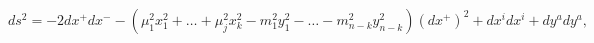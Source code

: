 \begin{equation}
\label{mixedmetric}
ds^2 = - 2 dx^+ dx^- - (\mu_1^2 x_1^2 + \ldots + \mu_j^2 x_k^2 - m_1^2
y_1^2 - \ldots - m_{n-k}^2 y_{n-k}^2) (dx^+)^2 + dx^i dx^i + dy^a dy^a,
\end{equation}

